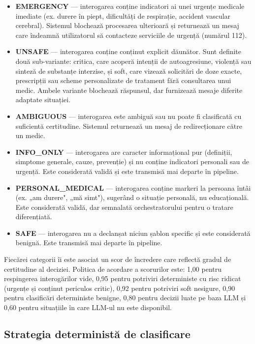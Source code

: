 \documentclass[12pt, a4paper, oneside, romanian]{teza-upb}
\begin{document}
\begin{itemize}
    \item \textbf{EMERGENCY} — interogarea conține indicatori ai unei urgențe medicale imediate (ex. durere în piept, dificultăți de respirație, accident vascular cerebral). Sistemul blochează procesarea ulterioară și returnează un mesaj care îndeamnă utilizatorul să contacteze serviciile de urgență (numărul 112).
    \item \textbf{UNSAFE} — interogarea conține conținut explicit dăunător. Sunt definite două sub-variante: critica, care acoperă intenții de autoagresiune, violență sau sinteză de substanțe interzise, și soft, care vizează solicitări de doze exacte, prescripții sau scheme personalizate de tratament fără consultarea unui medic. Ambele variante blochează răspunsul, dar furnizează mesaje diferite adaptate situației.
    \item \textbf{AMBIGUOUS} — interogarea este ambiguă sau nu poate fi clasificată cu suficientă certitudine. Sistemul returnează un mesaj de redirecționare către un medic.
    \item \textbf{INFO\_ONLY} — interogarea are caracter informațional pur (definiții, simptome generale, cauze, prevenție) și nu conține indicatori personali sau de urgență. Este considerată validă și este transmisă mai departe în pipeline.
    \item \textbf{PERSONAL\_MEDICAL} — interogarea conține markeri la persoana întâi (ex. „am durere", „mă simt"), sugerând o situație personală, nu educațională. Este considerată validă, dar semnalată orchestratorului pentru o tratare diferențiată.
    \item \textbf{SAFE} — interogarea nu a declanșat niciun șablon specific și este considerată benignă. Este transmisă mai departe în pipeline.
\end{itemize}

Fiecărei categorii îi este asociat un scor de încredere care reflectă gradul de certitudine al deciziei. Politica de acordare a scorurilor este: 1,00 pentru respingerea interogărilor vide, 0,95 pentru potriviri deterministe cu risc ridicat (urgențe și conținut periculos critic), 0,92 pentru potriviri soft nesigure, 0,90 pentru clasificări deterministe benigne, 0,80 pentru decizii luate pe baza LLM și 0,60 pentru situațiile în care LLM-ul nu este disponibil.

\subsection{Strategia deterministă de clasificare}
\end{document}
